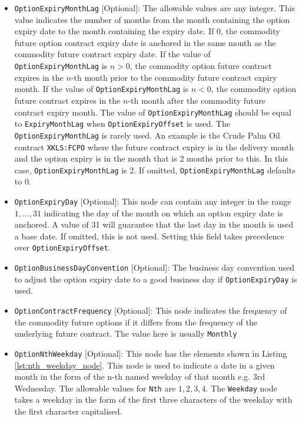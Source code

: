 \begin{itemize}
\item \lstinline!OptionExpiryMonthLag! [Optional]: The allowable values are any integer. This value indicates the number of months from the month containing the option expiry date to the month containing the expiry date. If 0, the commodity future option contract expiry date is anchored in the same month as the commodity future contract expiry date. If the value of \lstinline!OptionExpiryMonthLag! is $n > 0$, the commodity option future contract expires in the $n$-th month prior to the commodity future contract expiry month. If the value of \lstinline!OptionExpiryMonthLag! is $n < 0$, the commodity option future contract expires in the $n$-th month after the commodity future contract expiry month. The value of \lstinline!OptionExpiryMonthLag! should be equal to \lstinline!ExpiryMonthLag! when \lstinline!OptionExpiryOffset! is used. The \lstinline!OptionExpiryMonthLag! is rarely used. An example is the Crude Palm Oil contract \lstinline!XKLS:FCPO! where the future contract expiry is in the delivery month and the option expiry is in the month that is 2 months prior to this. In this case, \lstinline!OptionExpiryMonthLag! is 2. If omitted, \lstinline!OptionExpiryMonthLag! defaults to 0.
\item \lstinline!OptionExpiryDay! [Optional]: This node can contain any integer in the range $1,\ldots,31$ indicating the day of the month on which an option expiry date is anchored. A value of 31 will guarantee that the last day in the month is used a base date. If omitted, this is not used. Setting this field takes precedence over \lstinline!OptionExpiryOffset!.\item \lstinline!OptionBusinessDayConvention! [Optional]: The business day convention used to adjust the option expiry date to a good business day if \lstinline!OptionExpiryDay! is used.
\item \lstinline!OptionContractFrequency! [Optional]: This node indicates the frequency of the commodity future options if it differs from the frequency of the underlying future contract. The value here is usually \lstinline!Monthly!
\item \lstinline!OptionNthWeekday! [Optional]: This node has the elements shown in Listing \ref{lst:nth_weekday_node}. This node is used to indicate a date in a given month in the form of the n-th named weekday of that month e.g. 3rd Wednesday. The allowable values for \lstinline!Nth! are ${1,2,3,4}$. The \lstinline!Weekday! node takes a weekday in the form of the first three characters of the weekday with the first character capitalised.

\end{itemize}
